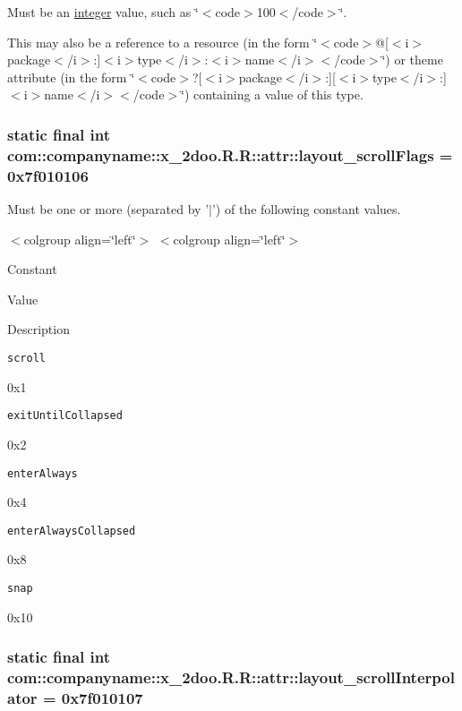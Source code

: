Must be an \hyperlink{classcom_1_1companyname_1_1x__2doo_1_1_r_1_1integer}{integer} value, such as \char`\"{}$<$code$>$100$<$/code$>$\char`\"{}. 

This may also be a reference to a resource (in the form \char`\"{}$<$code$>$@\mbox{[}$<$i$>$package$<$/i$>$:\mbox{]}$<$i$>$type$<$/i$>$:$<$i$>$name$<$/i$>$$<$/code$>$\char`\"{}) or theme attribute (in the form \char`\"{}$<$code$>$?\mbox{[}$<$i$>$package$<$/i$>$:\mbox{]}\mbox{[}$<$i$>$type$<$/i$>$:\mbox{]}$<$i$>$name$<$/i$>$$<$/code$>$\char`\"{}) containing a value of this type. \hypertarget{classcom_1_1companyname_1_1x__2doo_1_1_r_1_1attr_0ecb7a4eb79d00ad102fb68dd560654f}{
\subsubsection[{layout\_\-scrollFlags}]{\setlength{\rightskip}{0pt plus 5cm}static final int com::companyname::x\_\-2doo.R.R::attr::layout\_\-scrollFlags = 0x7f010106}}
\label{classcom_1_1companyname_1_1x__2doo_1_1_r_1_1attr_0ecb7a4eb79d00ad102fb68dd560654f}


Must be one or more (separated by '$|$') of the following constant values. \begin{TabularC}{0}
\hline
\end{TabularC}
$<$colgroup align=\char`\"{}left\char`\"{}$>$ $<$colgroup align=\char`\"{}left\char`\"{}$>$ 

Constant

Value

Description 

{\tt scroll}

0x1

{\tt exitUntilCollapsed}

0x2

{\tt enterAlways}

0x4

{\tt enterAlwaysCollapsed}

0x8

{\tt snap}

0x10\hypertarget{classcom_1_1companyname_1_1x__2doo_1_1_r_1_1attr_2a813ee94fe251ec08f7bbe0d4ea78c1}{
\subsubsection[{layout\_\-scrollInterpolator}]{\setlength{\rightskip}{0pt plus 5cm}static final int com::companyname::x\_\-2doo.R.R::attr::layout\_\-scrollInterpolator = 0x7f010107}}
\label{classcom_1_1companyname_1_1x__2doo_1_1_r_1_1attr_2a813ee94fe251ec08f7bbe0d4ea78c1}



